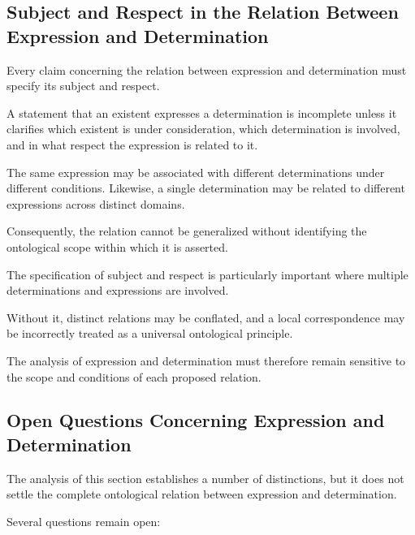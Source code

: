 \subsection{Subject and Respect in the Relation Between Expression and Determination}

Every claim concerning the relation between
expression and determination must specify
its subject and respect.

A statement that an existent expresses a determination
is incomplete unless it clarifies which existent
is under consideration, which determination
is involved, and in what respect the expression
is related to it.

The same expression may be associated with
different determinations under different conditions.
Likewise, a single determination may be related
to different expressions across distinct domains.

Consequently, the relation cannot be generalized
without identifying the ontological scope within
which it is asserted.

The specification of subject and respect is
particularly important where multiple determinations
and expressions are involved.

Without it, distinct relations may be conflated,
and a local correspondence may be incorrectly
treated as a universal ontological principle.

The analysis of expression and determination
must therefore remain sensitive to the scope
and conditions of each proposed relation.

\subsection{Open Questions Concerning Expression and Determination}

The analysis of this section establishes a number
of distinctions, but it does not settle the complete
ontological relation between expression and determination.

Several questions remain open:

